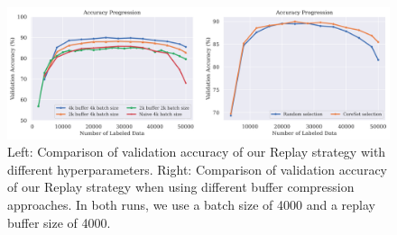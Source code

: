\begin{figure}[h]
    \centering
    \includegraphics[width=\linewidth]{images/results_CAL/replay_CAL.png}
    \caption[Continual Active Learning Custom Replay strategy]{Left: Comparison of validation accuracy of our Replay strategy with different hyperparameters. Right: Comparison of validation accuracy of our Replay strategy when using different buffer compression approaches.
    In both runs, we use a batch size of 4000 and a replay buffer size of 4000.}
    \label{fig:Evaluation:Results:CAL:Replay}
\end{figure}

